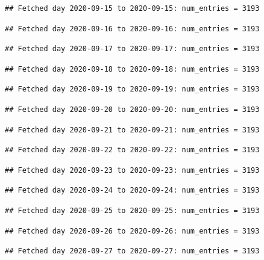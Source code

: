 \documentclass[]{article}
\begin{document}
\begin{verbatim}
## Fetched day 2020-09-15 to 2020-09-15: num_entries = 3193
\end{verbatim}

\begin{verbatim}
## Fetched day 2020-09-16 to 2020-09-16: num_entries = 3193
\end{verbatim}

\begin{verbatim}
## Fetched day 2020-09-17 to 2020-09-17: num_entries = 3193
\end{verbatim}

\begin{verbatim}
## Fetched day 2020-09-18 to 2020-09-18: num_entries = 3193
\end{verbatim}

\begin{verbatim}
## Fetched day 2020-09-19 to 2020-09-19: num_entries = 3193
\end{verbatim}

\begin{verbatim}
## Fetched day 2020-09-20 to 2020-09-20: num_entries = 3193
\end{verbatim}

\begin{verbatim}
## Fetched day 2020-09-21 to 2020-09-21: num_entries = 3193
\end{verbatim}

\begin{verbatim}
## Fetched day 2020-09-22 to 2020-09-22: num_entries = 3193
\end{verbatim}

\begin{verbatim}
## Fetched day 2020-09-23 to 2020-09-23: num_entries = 3193
\end{verbatim}

\begin{verbatim}
## Fetched day 2020-09-24 to 2020-09-24: num_entries = 3193
\end{verbatim}

\begin{verbatim}
## Fetched day 2020-09-25 to 2020-09-25: num_entries = 3193
\end{verbatim}

\begin{verbatim}
## Fetched day 2020-09-26 to 2020-09-26: num_entries = 3193
\end{verbatim}

\begin{verbatim}
## Fetched day 2020-09-27 to 2020-09-27: num_entries = 3193
\end{verbatim}
\end{document}
